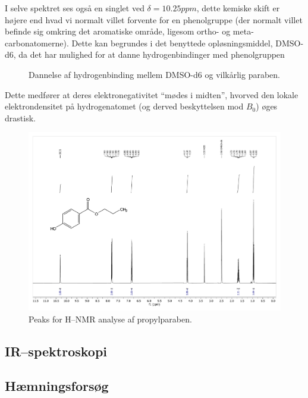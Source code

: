     I selve spektret ses også en singlet ved $\delta=10.25\si{ppm}$, dette kemiske skift er højere end hvad vi normalt villet forvente for en phenolgruppe (der normalt villet befinde sig omkring det aromatiske område, ligesom ortho- og meta-carbonatomerne). Dette kan begrundes i det benyttede opløsningsmiddel, DMSO-d6, da det har mulighed for at danne hydrogenbindinger med phenolgruppen \parencite{Raym2007}
    \begin{figure}[H]\centering
        \caption{Dannelse af hydrogenbinding mellem DMSO-d6 og vilkårlig paraben.}
    \end{figure}
    Dette medfører at deres elektronegativitet ``mødes i midten'', hvorved den lokale elektrondensitet på hydrogenatomet (og derved beskyttelsen mod $B_0$) øges drastisk.
    \begin{figure}[H] \centering
        \includegraphics[width=\textwidth,page=2]{bilag/propylnmr}
        \caption{Peaks for H--NMR analyse af propylparaben.}
    \end{figure} 

    \subsection{IR--spektroskopi}


    \subsection{Hæmningsforsøg}
    

